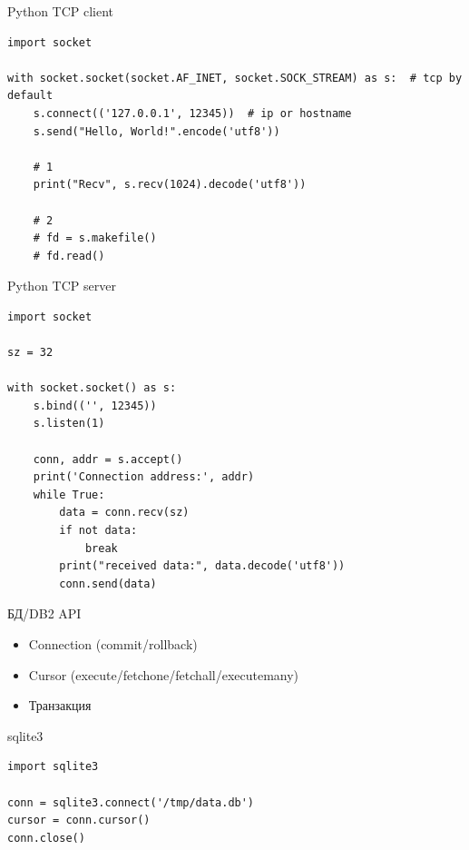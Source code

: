 \documentclass{article}
\begin{document}
\begin{center} Python TCP client \end{center}
\begin{lstlisting}
import socket

with socket.socket(socket.AF_INET, socket.SOCK_STREAM) as s:  # tcp by default
    s.connect(('127.0.0.1', 12345))  # ip or hostname
    s.send("Hello, World!".encode('utf8'))

    # 1
    print("Recv", s.recv(1024).decode('utf8'))

    # 2
    # fd = s.makefile()
    # fd.read()
\end{lstlisting}
\newpage


\begin{center} Python TCP server \end{center}
\begin{lstlisting}
import socket

sz = 32

with socket.socket() as s:
    s.bind(('', 12345))
    s.listen(1)

    conn, addr = s.accept()
    print('Connection address:', addr)
    while True:
        data = conn.recv(sz)
        if not data:
            break
        print("received data:", data.decode('utf8'))
        conn.send(data)
\end{lstlisting}
\newpage

\begin{center} БД/DB2 API \end{center}
\begin{itemize}
    \item Connection (commit/rollback)
    \item Cursor (execute/fetchone/fetchall/executemany)
    \item Транзакция
\end{itemize}
\newpage

\begin{center} sqlite3 \end{center}
\begin{lstlisting}
import sqlite3

conn = sqlite3.connect('/tmp/data.db')
cursor = conn.cursor()
conn.close()

\end{lstlisting}
\newpage
\end{document}
